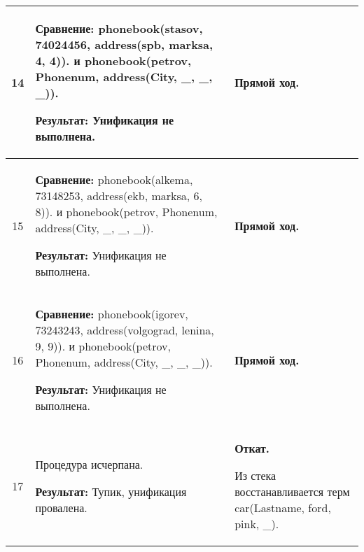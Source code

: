 \begin{longtable}{|c|p{}|p{}|}
    14
                       &
\textbf{Сравнение:} \newline
    phonebook(stasov, 74024456,
              address(spb,       marksa,       4,  4)).
    \newline и \newline
    phonebook(petrov, Phonenum, address(City, \_, \_, \_)).
    \newline

    \textbf{Результат:} \newline
    Унификация не выполнена.
                       &
    \textbf{Прямой ход.}
                       \\ \hline

    15
                       &
\textbf{Сравнение:} \newline
    phonebook(alkema, 73148253,
              address(ekb,       marksa,       6,  8)).
    \newline и \newline
    phonebook(petrov, Phonenum, address(City, \_, \_, \_)).
    \newline

    \textbf{Результат:} \newline
    Унификация не выполнена.
                       &
    \textbf{Прямой ход.}
                       \\ \hline

    16
                       &
\textbf{Сравнение:} \newline
    phonebook(igorev, 73243243,
              address(volgograd, lenina,       9,  9)).
    \newline и \newline
    phonebook(petrov, Phonenum, address(City, \_, \_, \_)).
    \newline

    \textbf{Результат:} \newline
    Унификация не выполнена.
                       &
    \textbf{Прямой ход.}
                       \\ \hline

    17
                       &
    Процедура исчерпана.
    \newline

    \textbf{Результат:} \newline
    Тупик, унификация провалена.
                       &
    \textbf{Откат.}
    \newline

    Из стека восстанавливается терм \newline
    car(Lastname, ford, pink, \_).
                       \\ \hline


\end{longtable}
